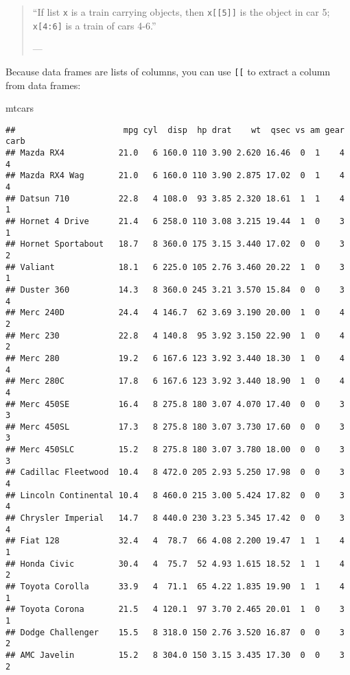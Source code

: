 \documentclass[
]{book}
\newenvironment{Shaded}{\begin{snugshade}}{\end{snugshade}}
\newcommand{\NormalTok}[1]{#1}
\begin{document}
\begin{quote}
``If list \texttt{x} is a train carrying objects, then \texttt{x{[}{[}5{]}{]}} is
the object in car 5; \texttt{x{[}4:6{]}} is a train of cars 4-6.''

--- \citet{RLangTip}
\end{quote}

Because data frames are lists of columns, you can use \texttt{{[}{[}} to extract a column from data frames:

\begin{Shaded}
\begin{Highlighting}[]
\NormalTok{mtcars}
\end{Highlighting}
\end{Shaded}

\begin{verbatim}
##                      mpg cyl  disp  hp drat    wt  qsec vs am gear carb
## Mazda RX4           21.0   6 160.0 110 3.90 2.620 16.46  0  1    4    4
## Mazda RX4 Wag       21.0   6 160.0 110 3.90 2.875 17.02  0  1    4    4
## Datsun 710          22.8   4 108.0  93 3.85 2.320 18.61  1  1    4    1
## Hornet 4 Drive      21.4   6 258.0 110 3.08 3.215 19.44  1  0    3    1
## Hornet Sportabout   18.7   8 360.0 175 3.15 3.440 17.02  0  0    3    2
## Valiant             18.1   6 225.0 105 2.76 3.460 20.22  1  0    3    1
## Duster 360          14.3   8 360.0 245 3.21 3.570 15.84  0  0    3    4
## Merc 240D           24.4   4 146.7  62 3.69 3.190 20.00  1  0    4    2
## Merc 230            22.8   4 140.8  95 3.92 3.150 22.90  1  0    4    2
## Merc 280            19.2   6 167.6 123 3.92 3.440 18.30  1  0    4    4
## Merc 280C           17.8   6 167.6 123 3.92 3.440 18.90  1  0    4    4
## Merc 450SE          16.4   8 275.8 180 3.07 4.070 17.40  0  0    3    3
## Merc 450SL          17.3   8 275.8 180 3.07 3.730 17.60  0  0    3    3
## Merc 450SLC         15.2   8 275.8 180 3.07 3.780 18.00  0  0    3    3
## Cadillac Fleetwood  10.4   8 472.0 205 2.93 5.250 17.98  0  0    3    4
## Lincoln Continental 10.4   8 460.0 215 3.00 5.424 17.82  0  0    3    4
## Chrysler Imperial   14.7   8 440.0 230 3.23 5.345 17.42  0  0    3    4
## Fiat 128            32.4   4  78.7  66 4.08 2.200 19.47  1  1    4    1
## Honda Civic         30.4   4  75.7  52 4.93 1.615 18.52  1  1    4    2
## Toyota Corolla      33.9   4  71.1  65 4.22 1.835 19.90  1  1    4    1
## Toyota Corona       21.5   4 120.1  97 3.70 2.465 20.01  1  0    3    1
## Dodge Challenger    15.5   8 318.0 150 2.76 3.520 16.87  0  0    3    2
## AMC Javelin         15.2   8 304.0 150 3.15 3.435 17.30  0  0    3    2

\end{verbatim}
\end{document}
